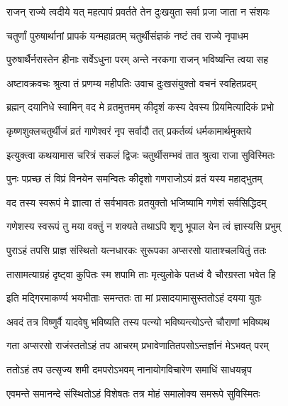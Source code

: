 \twolineshloka
{राजन् राज्ये त्वदीये यत् महत्पापं प्रवर्तते}
{तेन दुःखयुता सर्वा प्रजा जाता न संशयः} %

\twolineshloka
{चतुर्णां पुरुषार्थानां प्रापकं यन्महाव्रतम्}
{चतुर्थीसंज्ञकं नष्टं तव राज्ये नृपाधम} %

\twolineshloka
{पुरुषार्थैर्नरास्तेन हीनाः सर्वेऽधुना परम्}
{अन्ते नरकगा राजन् भविष्यन्ति त्वया सह} %

\twolineshloka
{अष्टावक्रवचः श्रुत्वा तं प्रणम्य महीपतिः}
{उवाच दुःखसंयुक्तो वचनं स्वहितप्रदम्} %


\twolineshloka
{ब्रह्मन् दयानिधे स्वामिन् वद मे व्रतमुत्तमम्}
{कीदृशं कस्य देवस्य प्रियमित्यादिकं प्रभो} %


\twolineshloka
{कृष्णशुक्लचतुर्थीजं व्रतं गाणेश्वरं नृप}
{सर्वादौ तत् प्रकर्तव्यं धर्मकामार्थमुक्तये} %

\twolineshloka
{इत्युक्त्वा कथयामास चरित्रं सकलं द्विजः}
{चतुर्थीसम्भवं तात श्रुत्वा राजा सुविस्मितः} %

\twolineshloka
{पुनः पप्रच्छ तं विप्रं विनयेन समन्वितः}
{कीदृशो गणराजोऽयं व्रतं यस्य महाद्भुतम्} %

\twolineshloka
{वद तस्य स्वरूपं मे ज्ञात्वा तं सर्वभावतः}
{व्रतयुक्तो भजिष्यामि गणेशं सर्वसिद्धिदम्} %


\twolineshloka
{गणेशस्य स्वरूपं तु मया वक्तुं न शक्यते}
{तथाऽपि श‍ृणु भूपाल येन त्वं ज्ञास्यसि प्रभुम्} %

\twolineshloka
{पुराऽहं तपसि प्राज्ञ संस्थितो यत्नधारकः}
{सुरूपका अप्सरसो याताश्चलयितुं ततः} %

\twolineshloka
{तासामत्याग्रहं दृष्ट्वा कुपितः स्म शपामि ताः}
{मृत्युलोके पतध्वं वै चौरग्रस्ता भवेत हि} %

\twolineshloka
{इति मद्गिरमाकर्ण्य भयभीताः समन्ततः}
{ता मां प्रसादयामासुस्ततोऽहं दयया युतः} %

\twolineshloka
{अवदं तत्र विष्णुर्वै यादवेषु भविष्यति}
{तस्य पत्न्यो भविष्यन्त्योऽन्ते चौराणां भविष्यथ} %

\twolineshloka
{गता अप्सरसो राजंस्ततोऽहं तप आचरम्}
{प्रभावेणातितपसोऽन्तर्ज्ञानं मेऽभवत् परम्} %

\twolineshloka
{ततोऽहं तप उत्सृज्य शमी दमपरोऽभवम्}
{नानायोगविचारेण समाधिं साधयन्नृप} %

\twolineshloka
{एवमन्ते समानन्दे संस्थितोऽहं विशेषतः}
{तत्र मोहं समालोक्य समरूपे सुविस्मितः} %

